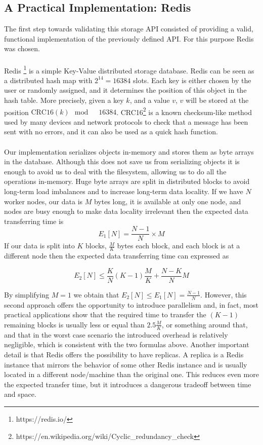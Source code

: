 \subsection{A Practical Implementation: Redis}
\label{subsec:storage_redis}
The first step towards validating this storage API consisted of providing a valid, functional implementation of the previously defined API. For this purpose Redis was chosen.\\
\\
Redis \footnote{https://redis.io/} is a simple Key-Value distributed storage database. Redis can be seen as a distributed hash map with $2^14 = 16384$ slots. Each key is either chosen by the user or randomly assigned, and it determines the position of this object in the hash table. More precisely, given a key $k$, and a value $v$, $v$ will be stored at the position $\textrm{CRC16}(k) \mod \quad 16384$. CRC16\footnote{https://en.wikipedia.org/wiki/Cyclic\_redundancy\_check} is a known checksum-like method used by many devices and network protocols to check that a message has been sent with no errors, and it can also be used as a quick hash function.\\
\\
Our implementation serializes objects in-memory and stores them as byte arrays in the database. Although this does not save us from serializing objects it is enough to avoid us to deal with the filesystem, allowing us to do all the operations in-memory. Huge byte arrays are split in distributed blocks to avoid long-term load imbalances and to increase long-term data locality. If we have $N$ worker nodes, our data is $M$ bytes long, it is available at only one node, and nodes are busy enough to make data locality irrelevant then the expected data transferring time is
$$E_1[N] = \frac{N - 1}{N} \times M$$
If our data is split into $K$ blocks, $\frac{M}{K}$ bytes each block, and each block is at a different node then the expected data transferring time can expressed as

$$E_2[N] \leq \frac{K}{N}(K - 1)\frac{M}{K} + \frac{N - K}{N}M$$

By simplifying $M = 1$ we obtain that $E_2[N] \leq E_1[N] = \frac{N - 1}{N}$. However, this second approach offers the opportunity to introduce parallelism and, in fact, most practical applications show that the required time to transfer the $(K - 1)$ remaining blocks is usually less or equal than $2.5\frac{M}{K}$, or something around that, and that in the worst case scenario the introduced overhead is relatively negligible, which is consistent with the two formulas above. Another important detail is that Redis offers the possibility to have replicas. A replica is a Redis instance that mirrors the behavior of some other Redis instance and is usually located in a different node/machine than the original one. This reduces even more the expected transfer time, but it introduces a dangerous tradeoff between time and space.

